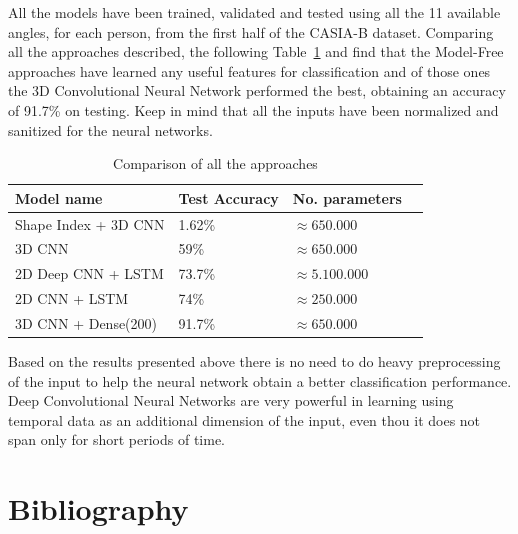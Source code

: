 \documentclass[12pt]{article}
\theoremstyle{definition}
\begin{document}
	All the models have been trained, validated and tested using all the 11 available angles, for each person, from the first half of the CASIA-B dataset. Comparing all the approaches described, the following Table~\ref{table:all-result} and find that the Model-Free approaches have learned any useful features for classification and of those ones the 3D Convolutional Neural Network performed the best, obtaining an accuracy of 91.7\% on testing. Keep in mind that all the inputs have been normalized and sanitized for the neural networks.

	\begin{table}[h]
		\centering
		\renewcommand{\arraystretch}{1.5}

		\caption{Comparison of all the approaches}
		\label{table:all-result}

		\begin{tabularx}{\textwidth}{XXXX}
			\textbf{Model name} & \textbf{Test Accuracy} & \textbf{No. parameters} \\ \hline
			Shape Index + 3D CNN    & 1.62\%         & $\approx 650.000$        \\ \hline
			3D CNN                  & 59\%           & $\approx 650.000$        \\ \hline
			2D Deep CNN + LSTM      & 73.7\%         & $\approx 5.100.000$      \\ \hline
			2D CNN + LSTM           & 74\%           & $\approx 250.000$        \\ \hline
			3D CNN + Dense(200)     & 91.7\%         & $\approx 650.000$        \\
		\end{tabularx}
	\end{table}

	Based on the results presented above there is no need to do heavy preprocessing of the input to help the neural network obtain a better classification performance. Deep Convolutional Neural Networks are very powerful in learning using temporal data as an additional dimension of the input, even thou it does not span only for short periods of time.

	\clearpage

	\section{Bibliography}
	
	
\end{document}
